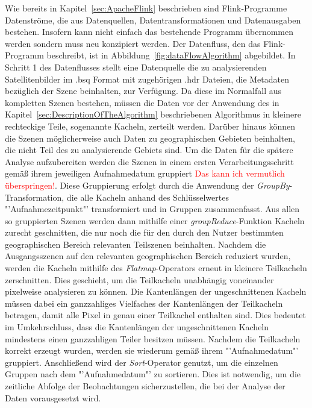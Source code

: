 Wie bereits in Kapitel~\ref{sec:ApacheFlink} beschrieben sind Flink-Programme Datenströme, die aus Datenquellen, Datentransformationen und Datenausgaben bestehen. Insofern kann nicht einfach das bestehende Programm übernommen werden sondern muss neu konzipiert werden. Der Datenfluss, den das Flink-Programm beschreibt, ist in Abbildung~\ref{fig:dataFlowAlgorithm} abgebildet. In Schritt 1 des Datenflusses stellt eine Datenquelle die zu analysierenden Satellitenbilder im .bsq Format mit zugehörigen .hdr Dateien, die Metadaten bezüglich der Szene beinhalten, zur Verfügung. Da diese im Normalfall aus kompletten Szenen bestehen, müssen die Daten vor der Anwendung des in Kapitel~\ref{sec:DescriptionOfTheAlgorithm} beschriebenen Algorithmus in kleinere rechteckige Teile, sogenannte Kacheln, zerteilt werden. Darüber hinaus können die Szenen möglicherweise auch Daten zu geographischen Gebieten beinhalten, die nicht Teil des zu analysierende Gebiets sind. Um die Daten für die spätere Analyse aufzubereiten werden die Szenen in einem ersten Verarbeitungsschritt gemäß ihrem jeweiligen Aufnahmedatum gruppiert \textcolor{red}{Das kann ich vermutlich überspringen!}. Diese Gruppierung erfolgt durch die Anwendung der \textit{GroupBy}-Transformation, die alle Kacheln anhand des Schlüsselwertes "'Aufnahmezeitpunkt"' transformiert und in Gruppen zusammenfasst. Aus allen so gruppierten Szenen werden dann mithilfe einer \textit{groupReduce}-Funktion Kacheln zurecht geschnitten, die nur noch die für den durch den Nutzer bestimmten geographischen Bereich relevanten Teilszenen beinhalten. Nachdem die Ausgangsszenen auf den relevanten geographischen Bereich reduziert wurden, werden die Kacheln mithilfe des \textit{Flatmap}-Operators erneut in kleinere Teilkacheln zerschnitten. Dies geschieht, um die Teilkacheln unabhängig voneinander pixelweise analysieren zu können. Die Kantenlängen der ungeschnittenen Kacheln müssen dabei ein ganzzahliges Vielfaches der Kantenlängen der Teilkacheln betragen, damit alle Pixel in genau einer Teilkachel enthalten sind. Dies bedeutet im Umkehrschluss, dass die Kantenlängen der ungeschnittenen Kacheln mindestens einen ganzzahligen Teiler besitzen müssen.  Nachdem die Teilkacheln korrekt erzeugt wurden, werden sie wiederum gemäß ihrem "'Aufnahmedatum"' gruppiert. Anschließend wird der \textit{Sort}-Operator genutzt, um die einzelnen Gruppen nach dem "'Aufnahmedatum"' zu sortieren. Dies ist notwendig, um die zeitliche Abfolge der Beobachtungen sicherzustellen, die bei der Analyse der Daten vorausgesetzt wird. 
